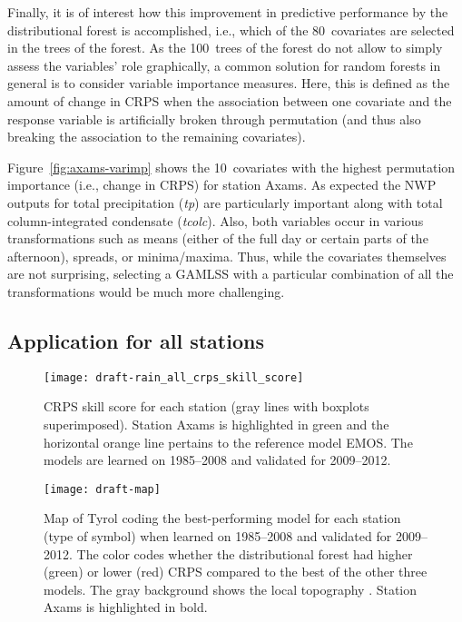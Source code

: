 \documentclass[aoas, preprint]{imsart}
\numberwithin{equation}{subsection}
\begin{document}
Finally, it is of interest how this improvement in predictive performance
by the distributional forest is accomplished, i.e., which of the 80~covariates
are selected in the trees of the forest. As the 100~trees of the forest
do not allow to simply assess the variables' role graphically, a common
solution for random forests in general is to consider variable importance
measures. Here, this is defined as the amount of change in CRPS when
the association between one covariate and the response variable is
artificially broken through permutation (and thus also breaking the
association to the remaining covariates).

Figure~\ref{fig:axams-varimp} shows the 10~covariates with the highest permutation
importance (i.e., change in CRPS) for station Axams. As expected the NWP outputs
for total precipitation (\emph{tp}) are particularly important along with total
column-integrated condensate (\emph{tcolc}). Also, both variables occur
in various transformations such as means (either of the full day or certain parts
of the afternoon), spreads, or minima/maxima. Thus, while the covariates
themselves are not surprising, selecting a GAMLSS with a particular combination
of all the transformations would be much more challenging.


\subsection{Application for all stations}
\label{sec:all}

\begin{figure}[t!]
\centering
{}
\texttt{[image: draft-rain\_all\_crps\_skill\_score]}
\caption{\label{fig:all-crps}CRPS skill score for each station (gray lines
with boxplots superimposed). Station Axams is highlighted in green 
and the horizontal orange line pertains to the reference model EMOS. The models are 
learned on 1985--2008 and validated for 2009--2012.}
\end{figure}

\begin{figure}[t!]
\centering
{}
\texttt{[image: draft-map]}
\caption{\label{fig:all-map}Map of Tyrol coding the best-performing model
for each station (type of symbol) when learned on 1985--2008 and validated for 2009--2012.
The color codes whether the distributional 
forest had higher (green) or lower (red) CRPS compared to the best of the 
other three models. The gray background shows the local topography \citep{Robinson:2014}.
Station Axams is highlighted in bold.}
\end{figure}
\end{document}
